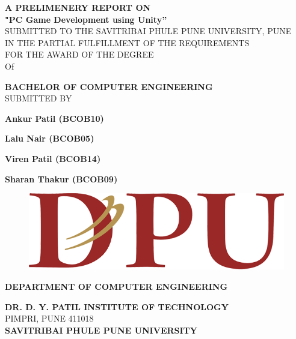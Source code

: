 \documentclass[12pt]{report}
\begin{document}

\centering \large \textbf  {A PRELIMENERY REPORT ON   }\\
\vspace{0.9 cm}
\Large \textbf{"PC Game Development using Unity”}\\
\vspace{0.5 cm}
\normalsize{SUBMITTED TO THE SAVITRIBAI PHULE PUNE UNIVERSITY, PUNE}\\
\normalsize{IN THE PARTIAL FULFILLMENT OF THE REQUIREMENTS}\\
\normalsize{  FOR THE AWARD OF THE DEGREE}\\
\vspace{0.8 cm}
\normalsize {Of}\\
\vspace{0.8 cm}

\Large\textbf{BACHELOR OF COMPUTER ENGINEERING}\\
\vspace{0.9 cm}
\large{SUBMITTED BY}\\
\vspace{0.3 cm}

\large \textbf  {Ankur Patil (BCOB10)}

\large \textbf  {Lalu Nair (BCOB05) }

\large \textbf{Viren Patil (BCOB14)}

\large \textbf{Sharan Thakur (BCOB09)}


\begin{figure}[h]
\centering
\includegraphics[scale=0.25]{Logo.png }
\end{figure}

\centering \Large \textbf  {DEPARTMENT OF COMPUTER ENGINEERING}\\
\vspace{0.4cm}

\large \textbf  {DR. D. Y. PATIL INSTITUTE OF TECHNOLOGY}\\
\normalsize {PIMPRI, PUNE 411018}\\
\vspace{0.2 cm}
\large \textbf{SAVITRIBAI PHULE PUNE UNIVERSITY}\\
\end{document}
